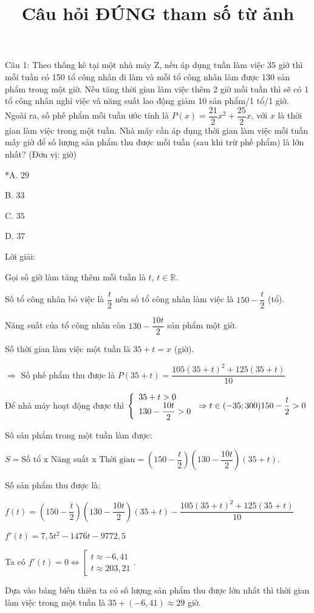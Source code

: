 \documentclass[a4paper,12pt]{article}
\begin{document}
\title{Câu hỏi ĐÚNG tham số từ ảnh}
\maketitle

Câu 1: Theo thống kê tại một nhà máy Z, nếu áp dụng tuần làm việc 35 giờ thì mỗi tuần có 150 tổ công nhân đi làm và mỗi tổ công nhân làm được 130 sản phẩm trong một giờ. Nếu tăng thời gian làm việc thêm 2 giờ mỗi tuần thì sẽ có 1 tổ công nhân nghỉ việc và năng suất lao động giảm 10 sản phẩm/1 tổ/1 giờ. Ngoài ra, số phế phẩm mỗi tuần ước tính là \(P(x)=\dfrac{21}{2}x^2 + \dfrac{25}{2}x\), với \(x\) là thời gian làm việc trong một tuần. Nhà máy cần áp dụng thời gian làm việc mỗi tuần mấy giờ để số lượng sản phẩm thu được mỗi tuần (sau khi trừ phế phẩm) là lớn nhất? (Đơn vị: giờ)

*A. \(29\)

B. \(33\)

C. \(35\)

D. \(37\)

Lời giải:


Gọi số giờ làm tăng thêm mỗi tuần là \(t\), \(t \in \mathbb{R}\).

Số tổ công nhân bỏ việc là \(\dfrac{t}{2}\) nên số tổ công nhân làm việc là \(150 - \dfrac{t}{2}\) (tổ).

Năng suất của tổ công nhân còn \(130 - \dfrac{10t}{2}\) sản phẩm một giờ.

Số thời gian làm việc một tuần là \(35 + t = x\) (giờ).

\(\Rightarrow\) Số phế phẩm thu được là \(P(35 + t) = \dfrac{105(35 + t)^2 + 125(35 + t)}{10}\)

Để nhà máy hoạt động được thì \(\left\{\begin{array}{l}35 + t > 0 \\ 130 - \dfrac{10t}{2} > 0\end{array}\right. \Rightarrow t \in(-35 ; 300) \\ 150 - \dfrac{t}{2} > 0\)

Số sản phẩm trong một tuần làm được:

\(S = \text{Số tổ x Năng suất x Thời gian} = \left(150 - \dfrac{t}{2}\right)\left(130 - \dfrac{10t}{2}\right)(35 + t)\).

Số sản phẩm thu được là:

\(f(t) = \left(150 - \dfrac{t}{2}\right)\left(130 - \dfrac{10t}{2}\right)(35 + t) - \dfrac{105(35 + t)^2 + 125(35 + t)}{10}\)

\(f'(t) = 7,5t^{2} - 1476t - 9772,5\)

Ta có \(f'(t) = 0 \Leftrightarrow \left[\begin{array}{l}t \approx -6,41 \\ t \approx 203,21\end{array}\right.\).

Dựa vào bảng biến thiên ta có số lượng sản phẩm thu được lớn nhất thì thời gian làm việc trong một tuần là \(35 + (-6,41) \approx 29\) giờ.
\end{document}
